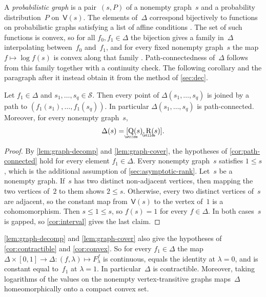 \documentclass[11pt,letterpaper]{article}
\DeclareMathOperator{\asympsubrank}{\underaccent{\wtilde}{Q}}
\DeclareMathOperator{\asymprank}{\underaccent{\wtilde}{R}}
\begin{document}
A \emph{probabilistic graph} is a pair~$(s,P)$ of a nonempty graph~$s$ and a probability distribution~$P$ on~$\mathsf{V}(s)$. The elements of~$\Delta$ correspond bijectively to functions on probabilistic graphs satisfying a list of affine conditions \cite[Theorems~1.1 and 1.2]{MR4357434}. The set of such functions is convex, so for all $f_0, f_1 \in \Delta$ the bijection gives a family in~$\Delta$ interpolating between~$f_0$ and~$f_1$, and for every fixed nonempty graph~$s$ the map $f \mapsto \log f(s)$ is convex along that family \cite[Section~4.5]{MR4357434}. Path-connectedness of~$\Delta$ follows from this family together with a continuity check. The following corollary and the paragraph after it instead obtain it from the method of \cref{sec:dec}. 

\begin{corollary}\label{cor:graph-paths}
Let $f_1 \in \Delta$ and $s_1, \ldots, s_q \in \mathcal{S}$. Then every point of $\Delta(s_1, \ldots, s_q)$ is joined by a path to $(f_1(s_1), \ldots, f_1(s_q))$. In particular $\Delta(s_1, \ldots, s_q)$ is path-connected. Moreover, for every nonempty graph~$s$,
\[
\Delta(s) = [\asympsubrank(s), \asymprank(s)].
\]
\end{corollary}
\begin{proof}
By \cref{lem:graph-decomp} and \cref{lem:graph-cover}, the hypotheses of \cref{cor:path-connected} hold for every element $f_1 \in \Delta$. Every nonempty graph~$s$ satisfies $1 \leq s$, which is the additional assumption of \cref{sec:asymptotic-rank}. Let~$s$ be a nonempty graph. If~$s$ has two distinct non-adjacent vertices, then mapping the two vertices of~$2$ to them shows $2 \leq s$. Otherwise, every two distinct vertices of~$s$ are adjacent, so the constant map from~$\mathsf{V}(s)$ to the vertex of~$1$ is a cohomomorphism. Then $s \leq 1 \leq s$, so $f(s) = 1$ for every $f \in \Delta$. In both cases~$s$ is gapped, so \cref{cor:interval} gives the last claim.
\end{proof}

\cref{lem:graph-decomp} and \cref{lem:graph-cover} also give the hypotheses of \cref{cor:contractible} and \cref{cor:convex}. So for every $f_1 \in \Delta$ the map $\Delta \times [0,1] \to \Delta : (f,\lambda) \mapsto F^f_\lambda$ is continuous, equals the identity at $\lambda = 0$, and is constant equal to~$f_1$ at $\lambda = 1$. In particular~$\Delta$ is contractible. Moreover, taking logarithms of the values on the nonempty vertex-transitive graphs maps~$\Delta$ homeomorphically onto a compact convex set.
\end{document}
